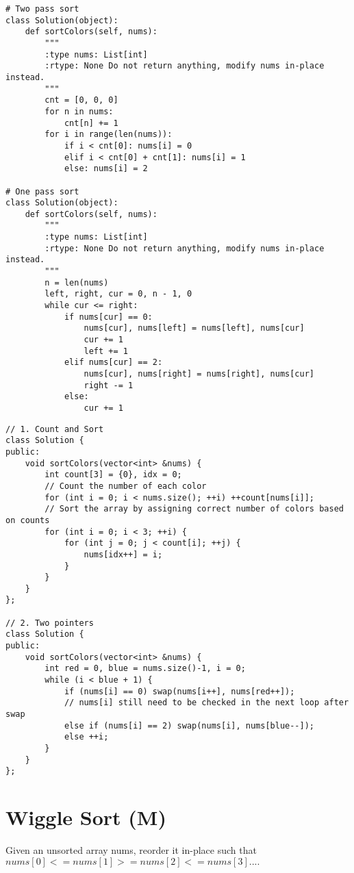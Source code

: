 \begin{lstlisting}
# Two pass sort
class Solution(object):
    def sortColors(self, nums):
        """
        :type nums: List[int]
        :rtype: None Do not return anything, modify nums in-place instead.
        """
        cnt = [0, 0, 0]
        for n in nums:
            cnt[n] += 1
        for i in range(len(nums)):
            if i < cnt[0]: nums[i] = 0
            elif i < cnt[0] + cnt[1]: nums[i] = 1
            else: nums[i] = 2
                
# One pass sort
class Solution(object):
    def sortColors(self, nums):
        """
        :type nums: List[int]
        :rtype: None Do not return anything, modify nums in-place instead.
        """
        n = len(nums)
        left, right, cur = 0, n - 1, 0
        while cur <= right:
            if nums[cur] == 0:
                nums[cur], nums[left] = nums[left], nums[cur]
                cur += 1
                left += 1
            elif nums[cur] == 2:
                nums[cur], nums[right] = nums[right], nums[cur]
                right -= 1
            else:
                cur += 1
\end{lstlisting}

\begin{lstlisting}
// 1. Count and Sort
class Solution {
public:
    void sortColors(vector<int> &nums) {
        int count[3] = {0}, idx = 0;
        // Count the number of each color
        for (int i = 0; i < nums.size(); ++i) ++count[nums[i]];
        // Sort the array by assigning correct number of colors based on counts
        for (int i = 0; i < 3; ++i) {
            for (int j = 0; j < count[i]; ++j) {
                nums[idx++] = i;
            }
        }
    }
};

// 2. Two pointers
class Solution {
public:
    void sortColors(vector<int> &nums) {
        int red = 0, blue = nums.size()-1, i = 0;
        while (i < blue + 1) {
            if (nums[i] == 0) swap(nums[i++], nums[red++]);
            // nums[i] still need to be checked in the next loop after swap
            else if (nums[i] == 2) swap(nums[i], nums[blue--]);
            else ++i;
        }
    }
};
\end{lstlisting}


\section{Wiggle Sort (M)}
Given an unsorted array nums, reorder it in-place such that $nums[0] <= nums[1] >= nums[2] <= nums[3]....$\\

